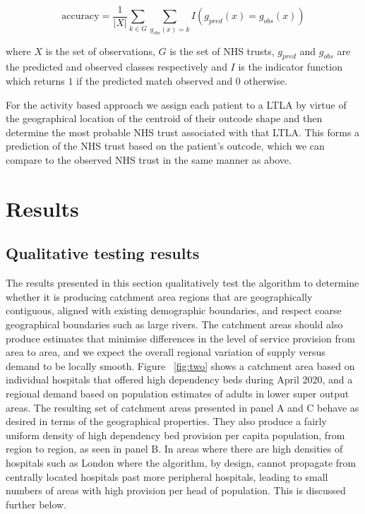 \documentclass[twocolumn]{bmcart}%
\begin{document}
\[
\text{accuracy} = \frac{1}{|X|} \sum_{k \in G} \sum_{g_{obs}(x) = k} I \left(g_{pred}(x) = g_{obs}(x)\right)
\] 

where \(X\) is the set of observations, \(G\) is the set of NHS trusts, \(g_{pred}\) and \(g_{obs}\) are the predicted 
and observed classes respectively and \(I\) is the indicator function which returns \(1\) if the predicted match 
observed and \(0\) otherwise.

For the activity based approach we assign each patient to a LTLA by virtue of the geographical location of the centroid 
of their outcode shape and then determine the most probable NHS trust associated with that LTLA. This forms a prediction 
of the NHS trust based on the patient's outcode, which we can compare to the observed NHS trust in the same manner as 
above.

\section*{Results}

\subsection*{Qualitative testing results}

The results presented in this section qualitatively test the algorithm to determine whether it is producing catchment 
area regions that are geographically contiguous, aligned with existing demographic boundaries, and respect coarse 
geographical boundaries such as large rivers. The catchment areas should also produce estimates that minimise 
differences in the level of service provision from area to area, and we expect the overall regional variation of supply 
versus demand to be locally smooth. Figure ~\ref{fig:two} shows a catchment area based on individual hospitals that 
offered high dependency beds during April 2020, and a regional demand based on population estimates of adults in lower 
super output areas. The resulting set of catchment areas presented in panel A and C behave as desired in terms of the 
geographical properties. They also produce a fairly uniform density of high dependency bed provision per capita 
population, from region to region, as seen in panel B. In areas where there are high densities of hospitals such as 
London where the algorithm, by design, cannot propagate from centrally located hospitals past more peripheral 
hospitals, leading to small numbers of areas with high provision per head of population. This is discussed further 
below.
\end{document}
